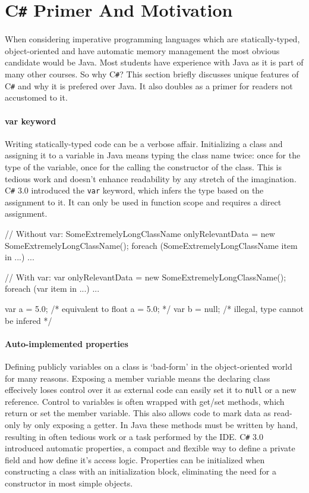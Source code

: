\documentclass[twoside,openright]{uva-bachelor-thesis}
\newcommand{\code}[1]{\texttt{\footnotesize#1}}
\newcommand{\cs}{C\texttt{\#}\xspace}
\begin{document}
	\section{\cs Primer And Motivation}
	\label{csprimer}
		When considering imperative programming languages which are statically-typed, object-oriented and have automatic memory management the most obvious candidate would be Java. Most students have experience with Java as it is part of many other courses. So why \cs? This section briefly discusses unique features of \cs and why it is prefered over Java. It also doubles as a primer for readers not accustomed to it.
		
		\paragraph{var keyword}
			Writing statically-typed code can be a verbose affair. Initializing a class and assigning it to a variable in Java means typing the class name twice: once for the type of the variable, once for the calling the constructor of the class. This is tedious work and doesn't enhance readability by any stretch of the imagination. \cs 3.0 introduced the \code{var} keyword, which infers the type based on the assignment to it. It can only be used in function scope and requires a direct assignment.
			
			\begin{codespan}
				\begin{csharpcode}
					// Without var:
					SomeExtremelyLongClassName onlyRelevantData = new SomeExtremelyLongClassName();
					foreach (SomeExtremelyLongClassName item in ...)
						...
					
					// With var:
					var onlyRelevantData = new SomeExtremelyLongClassName();
					foreach (var item in ...)
						...
						
					var a = 5.0;        /* equivalent to float a = 5.0; */
					var b = null;       /* illegal, type cannot be infered */
				\end{csharpcode}
			\end{codespan}
			
		\paragraph{Auto-implemented properties}
			Defining publicly variables on a class is `bad-form' in the object-oriented world for many reasons. Exposing a member variable means the declaring class effecively loses control over it as external code can easily set it to \code{null} or a new reference. Control to variables is often wrapped with get/set methods, which return or set the member variable. This also allows code to mark data as read-only by only exposing a getter. In Java these methods must be written by hand, resulting in often tedious work or a task performed by the IDE. \cs 3.0 introduced automatic properties, a compact and flexible way to define a private field and how define it's access logic. Properties can be initialized when constructing a class with an initialization block, eliminating the need for a constructor in most simple objects.
			
\end{document}
